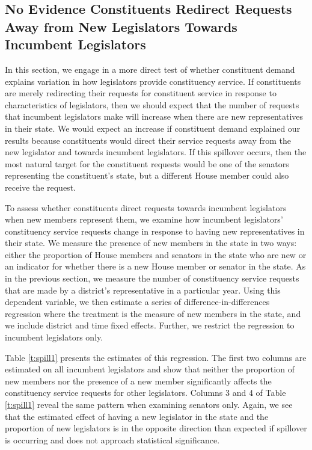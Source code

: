 \documentclass[12pt]{article}
\begin{document}
\subsection{No Evidence Constituents Redirect Requests Away from New Legislators Towards Incumbent Legislators}
In this section, we engage in a more direct test of whether constituent demand explains variation in how legislators provide constituency service. If constituents are merely redirecting their requests for constituent service in response to characteristics of legislators, then we should expect that the number of requests that incumbent legislators make will increase when there are new representatives in their state. We would expect an increase if constituent demand explained our results because constituents would direct their service requests away from the new legislator and towards incumbent legislators. If this spillover occurs, then the most natural target for the constituent requests would be one of the senators representing the constituent's state, but a different House member could also receive the request.   

To assess whether constituents direct requests towards incumbent legislators when new members represent them, we examine how incumbent legislators' constituency service requests change in response to having new representatives in their state. We measure the presence of new members in the state in two ways: either the proportion of House members and senators in the state who are new or an indicator for whether there is a new House member or senator in the state. As in the previous section, we measure the number of constituency service requests that are made by a district's representative in a particular year. Using this dependent variable, we then estimate a series of difference-in-differences regression where the treatment is the measure of new members in the state, and we include district and time fixed effects. Further, we restrict the regression to incumbent legislators only.   

Table \ref{t:spill1} presents the estimates of this regression. The first two columns are estimated on all incumbent legislators and show that neither the proportion of new members nor the presence of a new member significantly affects the constituency service requests for other legislators. Columns 3 and 4 of Table \ref{t:spill1} reveal the same pattern when examining senators only. Again, we see that the estimated effect of having a new legislator in the state and the proportion of new legislators is in the opposite direction than expected if spillover is occurring and does not approach statistical significance.  
\end{document}
